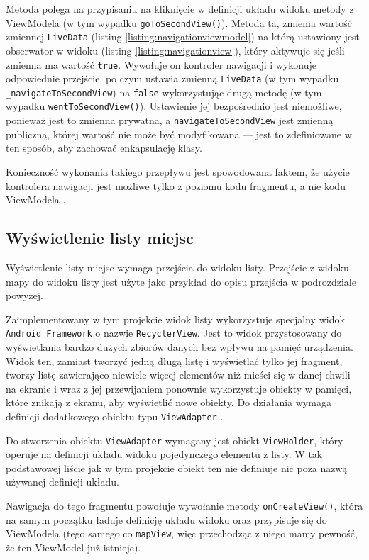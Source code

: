 \documentclass[polish,polish,a4paper,12pt]{article}
\begin{document}
	Metoda polega na przypisaniu na kliknięcie w definicji układu widoku metody z ViewModela (w tym wypadku \texttt{goToSecondView()}). Metoda ta, zmienia wartość zmiennej \texttt{LiveData} (listing \ref{listing:navigationviewmodel}) na którą ustawiony jest obserwator w widoku (listing \ref{listing:navigationview}), który aktywuje się jeśli zmienna ma wartość \texttt{true}. Wywołuje on kontroler nawigacji i wykonuje odpowiednie przejście, po czym ustawia zmienną \texttt{LiveData} (w tym wypadku \texttt{\_navigateToSecondView}) na \texttt{false} wykorzystując drugą metodę (w tym wypadku \texttt{wentToSecondView()}). Ustawienie jej bezpośrednio jest niemożliwe, ponieważ jest to zmienna prywatna, a \texttt{navigateToSecondView} jest zmienną publiczną, której wartość nie może być modyfikowana — jest to zdefiniowane w ten sposób, aby zachować enkapsulację klasy.

	Konieczność wykonania takiego przepływu jest spowodowana faktem, że użycie kontrolera nawigacji jest możliwe tylko z poziomu kodu fragmentu, a nie kodu ViewModela \cite{androidapi}.

	\subsection{Wyświetlenie listy miejsc}

	Wyświetlenie listy miejsc wymaga przejścia do widoku listy. Przejście z widoku mapy do widoku listy jest użyte jako przykład do opisu przejścia w podrozdziale powyżej.

	Zaimplementowany w tym projekcie widok listy wykorzystuje specjalny widok \texttt{Android Framework} o nazwie \texttt{RecyclerView}. Jest to widok przystosowany do wyświetlania bardzo dużych zbiorów danych bez wpływu na pamięć urządzenia. Widok ten, zamiast tworzyć jedną długą listę i wyświetlać tylko jej fragment, tworzy listę zawierająco niewiele więcej elementów niż mieści się w danej chwili na ekranie i wraz z jej przewijaniem ponownie wykorzystuje obiekty w pamięci, które znikają z ekranu, aby wyświetlić nowe obiekty. Do działania wymaga definicji dodatkowego obiektu typu \texttt{ViewAdapter} \cite{androidapi}.

	Do stworzenia obiektu \texttt{ViewAdapter} wymagany jest obiekt \texttt{ViewHolder}, który operuje na definicji układu widoku pojedynczego elementu z listy. W tak podstawowej liście jak w tym projekcie obiekt ten nie definiuje nic poza nazwą używanej definicji układu.

	Nawigacja do tego fragmentu powołuje wywołanie metody \texttt{onCreateView()}, która na samym początku ładuje definicję układu widoku oraz przypisuje się do ViewModela (tego samego co \texttt{mapView}, więc przechodząc z niego mamy pewność, że ten ViewModel już istnieje).
\end{document}
